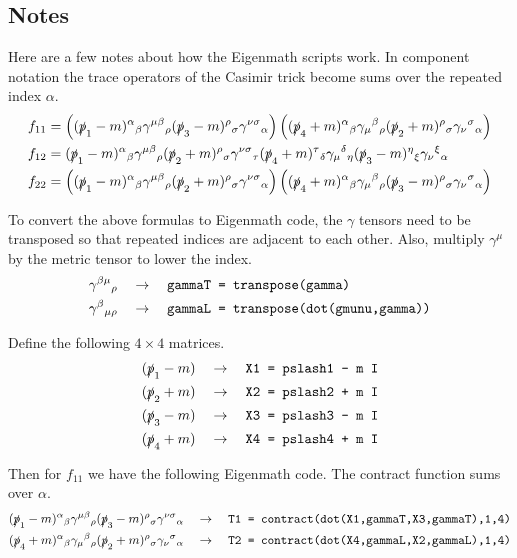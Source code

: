 \documentclass[12pt]{article}
\begin{document}
\subsection*{Notes}
Here are a few notes about how the Eigenmath scripts work.
In component notation the trace operators of the Casimir trick become sums over the repeated index $\alpha$.
\begin{align*}
f_{11}&=
\left(
(\slashed{p}_1-m)^\alpha{}_\beta
\gamma^{\mu\beta}{}_\rho
(\slashed{p}_3-m)^\rho{}_\sigma
\gamma^{\nu\sigma}{}_\alpha
\right)
\left(
(\slashed{p}_4+m)^\alpha{}_\beta
\gamma_\mu{}^\beta{}_\rho
(\slashed{p}_2+m)^\rho{}_\sigma
\gamma_\nu{}^\sigma{}_\alpha
\right)
\\
f_{12}&=
(\slashed{p}_1-m)^\alpha{}_\beta
\gamma^{\mu\beta}{}_\rho
(\slashed{p}_2+m)^\rho{}_\sigma
\gamma^{\nu\sigma}{}_\tau
(\slashed{p}_4+m)^\tau{}_\delta
\gamma_\mu{}^\delta{}_\eta
(\slashed{p}_3-m)^\eta{}_\xi
\gamma_\nu{}^\xi{}_\alpha
\\
f_{22}&=
\left(
(\slashed{p}_1-m)^\alpha{}_\beta
\gamma^{\mu\beta}{}_\rho
(\slashed{p}_2+m)^\rho{}_\sigma
\gamma^{\nu\sigma}{}_\alpha
\right)
\left(
(\slashed{p}_4+m)^\alpha{}_\beta
\gamma_\mu{}^\beta{}_\rho
(\slashed{p}_3-m)^\rho{}_\sigma
\gamma_\nu{}^\sigma{}_\alpha
\right)
\end{align*}

To convert the above formulas to Eigenmath code,
the $\gamma$ tensors need to be transposed
so that repeated indices are adjacent to each other.
Also, multiply $\gamma^\mu$ by the metric tensor to lower the index.
\begin{align*}
\gamma^{\beta\mu}{}_\rho\quad&\rightarrow\quad
\text{\tt gammaT = transpose(gamma)}\\
\gamma^\beta{}_{\mu\rho}\quad&\rightarrow\quad
\text{\tt gammaL = transpose(dot(gmunu,gamma))}
\end{align*}

Define the following $4\times4$ matrices.
\begin{align*}
(\slashed{p}_1-m)\quad&\rightarrow\quad\text{\tt X1 = pslash1 - m I}\\
(\slashed{p}_2+m)\quad&\rightarrow\quad\text{\tt X2 = pslash2 + m I}\\
(\slashed{p}_3-m)\quad&\rightarrow\quad\text{\tt X3 = pslash3 - m I}\\
(\slashed{p}_4+m)\quad&\rightarrow\quad\text{\tt X4 = pslash4 + m I}
\end{align*}

Then for $f_{11}$ we have the following Eigenmath code.
The contract function sums over $\alpha$.
\begin{align*}
(\slashed{p}_1-m)^\alpha{}_\beta
\gamma^{\mu\beta}{}_\rho
(\slashed{p}_3-m)^\rho{}_\sigma
\gamma^{\nu\sigma}{}_\alpha
\quad&\rightarrow\quad
\text{\tt T1 = contract(dot(X1,gammaT,X3,gammaT),1,4)}\\
(\slashed{p}_4+m)^\alpha{}_\beta
\gamma_\mu{}^\beta{}_\rho
(\slashed{p}_2+m)^\rho{}_\sigma
\gamma_\nu{}^\sigma{}_\alpha
\quad&\rightarrow\quad
\text{\tt T2 = contract(dot(X4,gammaL,X2,gammaL),1,4)}
\end{align*}
\end{document}
